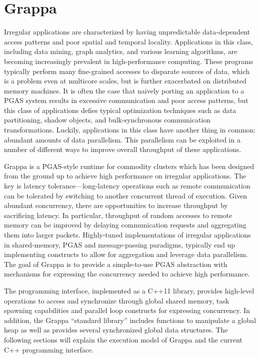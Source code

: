 \section{Grappa}

Irregular applications are characterized by having unpredictable data-dependent access patterns and poor spatial and temporal locality. Applications in this class, including data mining, graph analytics, and various learning algorithms, are becoming increasingly prevalent in high-performance computing. These programs typically perform many fine-grained accesses to disparate sources of data, which is a problem even at multicore scales, but is further exacerbated on distributed memory machines.
It is often the case that naively porting an application to a PGAS system results in excessive communication and poor access patterns, but this class of applications defies typical optimization techniques such as data partitioning, shadow objects, and bulk-synchronous communication transformations.
Luckily, applications in this class have another thing in common: abundant amounts of data parallelism. This parallelism can be exploited in a number of different ways to improve overall throughput of these applications.


Grappa is a PGAS-style runtime for commodity clusters which has been designed from the ground up to achieve high performance on irregular applications. The key is latency tolerance---long-latency operations such as remote communication can be tolerated by switching to another concurrent thread of execution. Given abundant  concurrency, there are opportunities to increase throughput by sacrificing latency. In particular, throughput of random accesses to remote memory can be improved by delaying communication requests and aggregating them into larger packets. Highly-tuned implementations of irregular applications in shared-memory, PGAS and message-passing paradigms, typically end up implementing constructs to allow for aggregation and leverage data parallelism. The goal of Grappa is to provide a simple-to-use PGAS abstraction with mechanisms for expressing the concurrency needed to achieve high performance.

The programming interface, implemented as a C++11 library, provides high-level operations to access and synchronize through global shared memory, task spawning capabilities and parallel loop constructs for expressing concurrency. In addition, the Grappa ``standard library'' includes functions to manipulate a global heap as well as provides several synchronized global data structures. The following sections will explain the execution model of Grappa and the current C++ programming interface.

